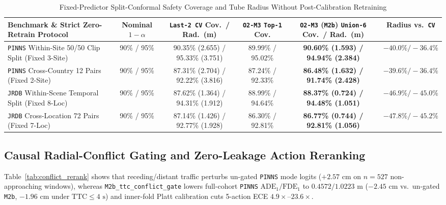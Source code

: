 \documentclass[journal]{IEEEtran}
\begin{document}
\begin{table}[!t]
\centering
\caption{Fixed-Predictor Split-Conformal Safety Coverage and Tube Radius Without Post-Calibration Retraining}
\label{tab:split_conformal}
\footnotesize
\begin{tabular}{lccccc}
\toprule
Benchmark \& Strict Zero-Retrain Protocol & Nominal $1-\alpha$ & \texttt{Last-2 CV} Cov.\ / Rad.\ (m) & \texttt{O2-M3} \texttt{Top-1} Cov. & \texttt{O2-M3} (\texttt{M2b}) \texttt{Union-6} Cov.\ / Rad.\ (m) & Radius vs.\ \texttt{CV} \\
\midrule
\texttt{PINNS} Within-Site 50/50 Clip Split (Fixed 3-Site) & 90\% / 95\% & 90.35\% (2.655) / 95.33\% (3.751) & 89.99\% / 95.02\% & \textbf{90.60\% (1.593) / 94.94\% (2.384)} & \textbf{$-40.0\% / -36.4\%$} \\
\texttt{PINNS} Cross-Country 12 Pairs (Fixed 2-Site) & 90\% / 95\% & 87.31\% (2.704) / 92.22\% (3.816) & 87.24\% / 92.33\% & \textbf{86.48\% (1.632) / 91.74\% (2.428)} & \textbf{$-39.6\% / -36.4\%$} \\
\texttt{JRDB} Within-Scene Temporal Split (Fixed 8-Loc) & 90\% / 95\% & 87.62\% (1.364) / 94.31\% (1.912) & 88.99\% / 94.64\% & \textbf{88.37\% (0.724) / 94.48\% (1.051)} & \textbf{$-46.9\% / -45.0\%$} \\
\texttt{JRDB} Cross-Location 72 Pairs (Fixed 7-Loc) & 90\% / 95\% & 87.14\% (1.426) / 92.77\% (1.928) & 86.30\% / 92.81\% & \textbf{86.77\% (0.744) / 92.81\% (1.056)} & \textbf{$-47.8\% / -45.2\%$} \\
\bottomrule
\end{tabular}
\end{table}

\subsection{Causal Radial-Conflict Gating and Zero-Leakage Action Reranking}
Table~\ref{tab:conflict_rerank} shows that receding/distant traffic perturbs un-gated \texttt{PINNS} mode logits ($+2.57\text{ cm}$ on $n=527$ non-approaching windows), whereas \texttt{M2b\_ttc\_conflict\_gate} lowers full-cohort \texttt{PINNS} $\text{ADE}_1 / \text{FDE}_1$ to $0.4572 / 1.0223\text{ m}$ ($-2.45\text{ cm}$ vs.\ un-gated \texttt{M2b}, $-1.96\text{ cm}$ under $\text{TTC} \le 4\text{ s}$) and inner-fold Platt calibration cuts 5-action ECE $4.9\times\text{--}23.6\times$.
\end{document}
